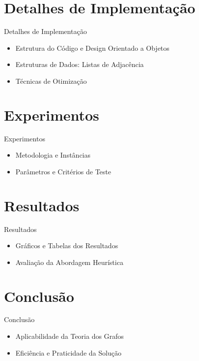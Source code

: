 \documentclass[aspectratio=169,xcolor=table]{beamer}
\begin{document}
\section{Detalhes de Implementação}

\begin{frame}{Detalhes de Implementação}
    \begin{itemize}
        \item Estrutura do Código e Design Orientado a Objetos
        \item Estruturas de Dados: Listas de Adjacência
        \item Técnicas de Otimização
    \end{itemize}
\end{frame}

\section{Experimentos}

\begin{frame}{Experimentos}
    \begin{itemize}
        \item Metodologia e Instâncias
        \item Parâmetros e Critérios de Teste
    \end{itemize}
\end{frame}

\section{Resultados}

\begin{frame}{Resultados}
    \begin{itemize}
        \item Gráficos e Tabelas dos Resultados
        \item Avaliação da Abordagem Heurística
    \end{itemize}
\end{frame}

\section{Conclusão}

\begin{frame}{Conclusão}
    \begin{itemize}
        \item Aplicabilidade da Teoria dos Grafos
        \item Eficiência e Praticidade da Solução
    \end{itemize}
\end{frame}
\end{document}

